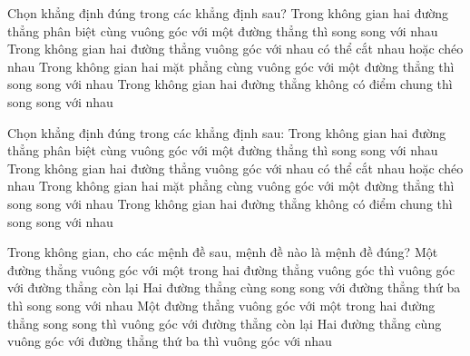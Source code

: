 \begin{ex}%
	Chọn khẳng định đúng trong  các khẳng định sau?
	 \choice
		 {Trong không gian hai đường thẳng phân biệt cùng vuông góc với một đường thẳng thì song song với nhau}
		{\True Trong  không gian hai đường thẳng vuông góc với nhau có thể cắt nhau hoặc chéo nhau}
		{Trong không gian hai mặt phẳng cùng vuông góc với một đường thẳng  thì song song với nhau}
		{Trong không gian hai đường thẳng không có  điểm chung thì song song với nhau}
\end{ex}

\begin{ex}%
	Chọn khẳng định đúng trong các  khẳng định sau:
	\choice 
		{Trong không  gian hai đường thẳng phân biệt cùng vuông góc với một đường thẳng thì song song với nhau}
		{\True  Trong không gian hai đường thẳng vuông góc với nhau có thể cắt nhau hoặc chéo nhau}
		{Trong không gian hai mặt phẳng cùng vuông góc với  một đường thẳng thì song song với nhau}
		{Trong  không gian hai đường thẳng không có điểm chung thì song song với nhau}
\end{ex}

\begin{ex}%
	 Trong không gian, cho các mệnh đề sau, mệnh đề nào là mệnh đề đúng?
	\choice 
		{Một đường thẳng vuông góc với một trong hai đường thẳng vuông góc thì vuông góc với đường thẳng còn  lại}
		{Hai đường thẳng cùng song song với đường thẳng thứ ba thì song song với nhau} 
		{\True Một đường thẳng vuông góc với một trong hai đường thẳng song  song thì vuông góc với đường thẳng còn lại}
		{Hai đường  thẳng cùng vuông góc với đường thẳng thứ ba thì vuông góc với nhau}
\end{ex}

